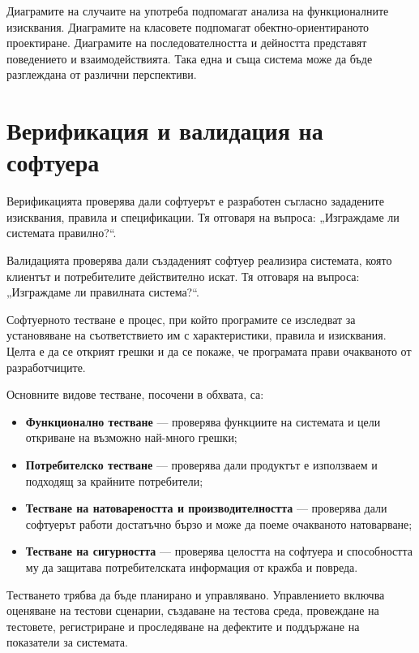 Диаграмите на случаите на употреба подпомагат анализа на функционалните изисквания. Диаграмите на класовете подпомагат обектно-ориентираното проектиране. Диаграмите на последователността и дейността представят поведението и взаимодействията. Така една и съща система може да бъде разглеждана от различни перспективи.

\section{Верификация и валидация на софтуера}\label{s:26.8}

\begin{defn}[Верификация]
Верификацията проверява дали софтуерът е разработен съгласно зададените изисквания, правила и спецификации. Тя отговаря на въпроса: „Изграждаме ли системата правилно?“.
\end{defn}

\begin{defn}[Валидация]
Валидацията проверява дали създаденият софтуер реализира системата, която клиентът и потребителите действително искат. Тя отговаря на въпроса: „Изграждаме ли правилната система?“.
\end{defn}

Софтуерното тестване е процес, при който програмите се изследват за установяване на съответствието им с характеристики, правила и изисквания. Целта е да се открият грешки и да се покаже, че програмата прави очакваното от разработчиците.

Основните видове тестване, посочени в обхвата, са:

\begin{itemize}
    \item \textbf{Функционално тестване} --- проверява функциите на системата и цели откриване на възможно най-много грешки;
    \item \textbf{Потребителско тестване} --- проверява дали продуктът е използваем и подходящ за крайните потребители;
    \item \textbf{Тестване на натовареността и производителността} --- проверява дали софтуерът работи достатъчно бързо и може да поеме очакваното натоварване;
    \item \textbf{Тестване на сигурността} --- проверява целостта на софтуера и способността му да защитава потребителската информация от кражба и повреда.
\end{itemize}

Тестването трябва да бъде планирано и управлявано. Управлението включва оценяване на тестови сценарии, създаване на тестова среда, провеждане на тестовете, регистриране и проследяване на дефектите и поддържане на показатели за системата.

